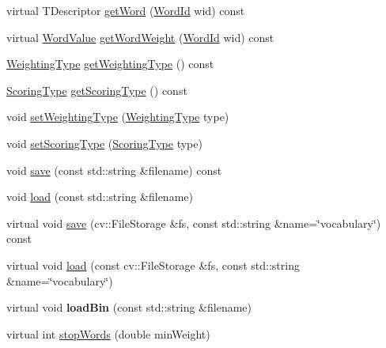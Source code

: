 \begin{DoxyCompactItemize}
\item 
virtual T\+Descriptor \hyperlink{classDBoW2_1_1TemplatedVocabulary_a3f0d8b15b4f673bf9888ff23489430b4}{get\+Word} (\hyperlink{namespaceDBoW2_ab1a0d3283b2d4690a383372ed20bfeb5}{Word\+Id} wid) const
\item 
virtual \hyperlink{namespaceDBoW2_a55fcd7333e591a38e96b91f41bc182f6}{Word\+Value} \hyperlink{classDBoW2_1_1TemplatedVocabulary_ace5645b42739bea1e3da05c6cff60bad}{get\+Word\+Weight} (\hyperlink{namespaceDBoW2_ab1a0d3283b2d4690a383372ed20bfeb5}{Word\+Id} wid) const
\item 
\hyperlink{namespaceDBoW2_a5de5c8a307aca9a84ffefda2a9bc467a}{Weighting\+Type} \hyperlink{classDBoW2_1_1TemplatedVocabulary_aadb9343da87e0f00ed3da401c59132b2}{get\+Weighting\+Type} () const
\item 
\hyperlink{namespaceDBoW2_aa252a592dd607c6e60dede06ceef2722}{Scoring\+Type} \hyperlink{classDBoW2_1_1TemplatedVocabulary_ad830e1e3e547e5d9d45971662afca3d5}{get\+Scoring\+Type} () const
\item 
void \hyperlink{classDBoW2_1_1TemplatedVocabulary_aa8f63a3379debd40214899d996cfc733}{set\+Weighting\+Type} (\hyperlink{namespaceDBoW2_a5de5c8a307aca9a84ffefda2a9bc467a}{Weighting\+Type} type)
\item 
void \hyperlink{classDBoW2_1_1TemplatedVocabulary_a05a6c2f46184618c9ea8368f53e6980c}{set\+Scoring\+Type} (\hyperlink{namespaceDBoW2_aa252a592dd607c6e60dede06ceef2722}{Scoring\+Type} type)
\item 
void \hyperlink{classDBoW2_1_1TemplatedVocabulary_a92ca49bd6600bddbad145fb6e0543fa1}{save} (const std\+::string \&filename) const
\item 
void \hyperlink{classDBoW2_1_1TemplatedVocabulary_afdec2031c98b9109451b1454f73348b0}{load} (const std\+::string \&filename)
\item 
virtual void \hyperlink{classDBoW2_1_1TemplatedVocabulary_a3039529c46f02b795450f4fba2207339}{save} (cv\+::\+File\+Storage \&fs, const std\+::string \&name=\char`\"{}vocabulary\char`\"{}) const
\item 
virtual void \hyperlink{classDBoW2_1_1TemplatedVocabulary_a037ba240314ff30f3620fb4de6845c66}{load} (const cv\+::\+File\+Storage \&fs, const std\+::string \&name=\char`\"{}vocabulary\char`\"{})
\item 
\mbox{\label{classDBoW2_1_1TemplatedVocabulary_a29ed12ac78aa6dc83d2a2e543d3ac675}} 
virtual void {\bfseries load\+Bin} (const std\+::string \&filename)
\item 
virtual int \hyperlink{classDBoW2_1_1TemplatedVocabulary_a0b6721fde54bd8cd008f6a120398741e}{stop\+Words} (double min\+Weight)
\end{DoxyCompactItemize}
